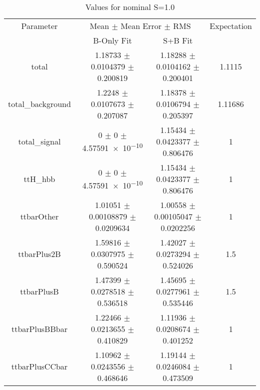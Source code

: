 \begin{table}
\centering
\caption{Values for nominal S=1.0}
\begin{tabular}{cccc}
\toprule
Parameter & \multicolumn{2}{c}{Mean $\pm$ Mean Error $\pm$ RMS} & Expectation\\
 & B-Only Fit & S+B Fit & \\
\midrule
total & \num{1.18733} $\pm$ \num{0.0104379} $\pm$ \num{0.200819} & \num{1.18288} $\pm$ \num{0.0104162} $\pm$ \num{0.200401} & \num{1.1115}\\
total\_background & \num{1.2248} $\pm$ \num{0.0107673} $\pm$ \num{0.207087} & \num{1.18378} $\pm$ \num{0.0106794} $\pm$ \num{0.205397} & \num{1.11686}\\
total\_signal & \num{0} $\pm$ \num{0} $\pm$ \num{4.57591e-10} & \num{1.15434} $\pm$ \num{0.0423377} $\pm$ \num{0.806476} & \num{1}\\
ttH\_hbb & \num{0} $\pm$ \num{0} $\pm$ \num{4.57591e-10} & \num{1.15434} $\pm$ \num{0.0423377} $\pm$ \num{0.806476} & \num{1}\\
ttbarOther & \num{1.01051} $\pm$ \num{0.00108879} $\pm$ \num{0.0209634} & \num{1.00558} $\pm$ \num{0.00105047} $\pm$ \num{0.0202256} & \num{1}\\
ttbarPlus2B & \num{1.59816} $\pm$ \num{0.0307975} $\pm$ \num{0.590524} & \num{1.42027} $\pm$ \num{0.0273294} $\pm$ \num{0.524026} & \num{1.5}\\
ttbarPlusB & \num{1.47399} $\pm$ \num{0.0278518} $\pm$ \num{0.536518} & \num{1.45695} $\pm$ \num{0.0277961} $\pm$ \num{0.535446} & \num{1.5}\\
ttbarPlusBBbar & \num{1.22466} $\pm$ \num{0.0213655} $\pm$ \num{0.410829} & \num{1.11936} $\pm$ \num{0.0208674} $\pm$ \num{0.401252} & \num{1}\\
ttbarPlusCCbar & \num{1.10962} $\pm$ \num{0.0243556} $\pm$ \num{0.468646} & \num{1.19144} $\pm$ \num{0.0246084} $\pm$ \num{0.473509} & \num{1}\\
\bottomrule
\end{tabular}
\end{table}